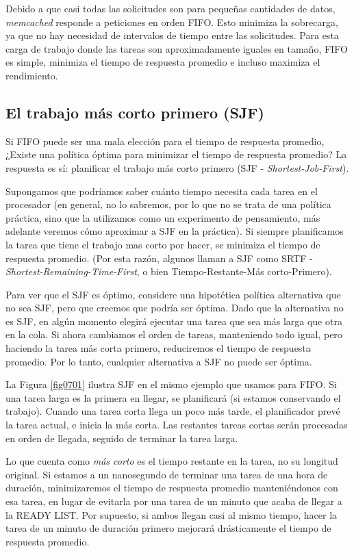 \documentclass[10pt]{book}
\begin{document}
Debido a que casi todas las solicitudes son para pequeñas cantidades de datos, \textit{memcached} responde a peticiones en orden FIFO. Esto minimiza la sobrecarga, ya que no hay necesidad de intervalos de tiempo entre las solicitudes. Para esta carga de trabajo donde las tareas son aproximadamente iguales en tamaño, FIFO es simple, minimiza el tiempo de respuesta promedio e incluso maximiza el rendimiento.

\subsection{El trabajo más corto primero (SJF)}
Si FIFO puede ser una mala elección para el tiempo de respuesta promedio, ¿Existe una política óptima para minimizar el tiempo de respuesta promedio? La respuesta es sí: planificar el trabajo más corto primero (SJF - \textit{Shortest-Job-First}).

Supongamos que podríamos saber cuánto tiempo necesita cada tarea en el procesador (en general, no lo sabremos, por lo que no se trata de una política práctica, sino que la utilizamos como un experimento de pensamiento, más adelante veremos cómo aproximar a SJF en la práctica). Si siempre planificamos la tarea que tiene el trabajo mas corto por hacer, se minimiza el tiempo de respuesta promedio. (Por esta razón, algunos llaman a SJF como SRTF - \textit{Shortest-Remaining-Time-First}, o bien Tiempo-Restante-Más corto-Primero).

Para ver que el SJF es óptimo, considere una hipotética política alternativa que no sea SJF, pero que creemos que podría ser óptima. Dado que la alternativa no es SJF, en algún momento elegirá ejecutar una tarea que sea más larga que otra en la cola. Si ahora cambiamos el orden de tareas, manteniendo todo igual, pero haciendo la tarea más corta primero, reduciremos el tiempo de respuesta promedio. Por lo tanto, cualquier alternativa a SJF no puede ser óptima.

La Figura \ref{fig0701} ilustra SJF en el mismo ejemplo que usamos para FIFO. Si una tarea larga es la primera en llegar, se planificará (si estamos conservando el trabajo). Cuando una tarea corta llega un poco más tarde, el planificador prevé la tarea actual, e inicia la más corta. Las restantes tareas cortas serán procesadas en orden de llegada, seguido de terminar la tarea larga.

Lo que cuenta como \textit{más corto} es el tiempo restante en la tarea, no su longitud original. Si estamos a un nanosegundo de terminar una tarea de una hora de duración, minimizaremos el tiempo de respuesta promedio manteniéndonos con esa tarea, en lugar de evitarla por una tarea de un minuto que acaba de llegar a la READY LIST. Por supuesto, si ambos llegan casi al mismo tiempo, hacer la tarea de un minuto de duración primero mejorará drásticamente el tiempo de respuesta promedio.
\end{document}
